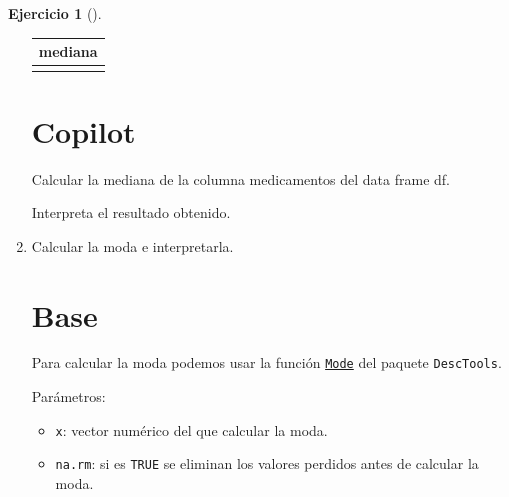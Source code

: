 \documentclass[
  a4paper,
]{scrreport}
\newenvironment{Shaded}{\begin{snugshade}}{\end{snugshade}}
\newcommand{\ExtensionTok}[1]{\textcolor[rgb]{0.00,0.23,0.31}{#1}}
\newcommand{\NormalTok}[1]{\textcolor[rgb]{0.00,0.23,0.31}{#1}}
\providecommand{\tightlist}{%
  \setlength{\itemsep}{0pt}\setlength{\parskip}{0pt}}\usepackage{longtable,booktabs,array}
\theoremstyle{definition}
\newtheorem{exercise}{Ejercicio}[chapter]
\theoremstyle{remark}
\begin{document}
\begin{exercise}[]
\begin{enumerate}
\begin{tcolorbox}
  \begin{longtable}[]{@{}r@{}}
  \toprule\noalign{}
  mediana \\
  \midrule\noalign{}
  \endhead
  \bottomrule\noalign{}
  \endlastfoot
  2 \\
  \end{longtable}

  \section{Copilot}

\begin{Shaded}
\begin{Highlighting}[]
\ExtensionTok{Calcular}\NormalTok{ la mediana de la columna medicamentos del data frame df.}

\ExtensionTok{Interpreta}\NormalTok{ el resultado obtenido.}
\end{Highlighting}
\end{Shaded}

  \end{tcolorbox}
\item
  Calcular la moda e interpretarla.

  \begin{tcolorbox}[enhanced jigsaw, colframe=quarto-callout-tip-color-frame, toprule=.15mm, bottomtitle=1mm, breakable, opacitybacktitle=0.6, toptitle=1mm, colback=white, bottomrule=.15mm, title=\textcolor{quarto-callout-tip-color}{\faLightbulb}\hspace{0.5em}{Solución}, arc=.35mm, left=2mm, titlerule=0mm, rightrule=.15mm, coltitle=black, leftrule=.75mm, opacityback=0, colbacktitle=quarto-callout-tip-color!10!white]

  \section{Base}

  Para calcular la moda podemos usar la función
  \href{https://www.rdocumentation.org/packages/DescTools/versions/0.99.0/topics/Mode}{\texttt{Mode}}
  del paquete \texttt{DescTools}.

  Parámetros:

  \begin{itemize}
  \tightlist
  \item
    \texttt{x}: vector numérico del que calcular la moda.
  \item
    \texttt{na.rm}: si es \texttt{TRUE} se eliminan los valores perdidos
    antes de calcular la moda.
  \end{itemize}


\end{tcolorbox}
\end{enumerate}
\end{exercise}
\end{document}

